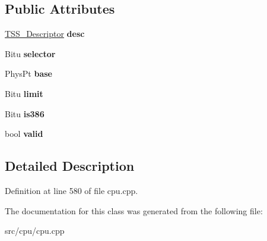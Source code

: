 \subsection*{Public Attributes}
\begin{DoxyCompactItemize}
\item 
\hypertarget{classTaskStateSegment_a46267346746acbf867d029fd39f902e3}{\hyperlink{classTSS__Descriptor}{T\-S\-S\-\_\-\-Descriptor} {\bfseries desc}}\label{classTaskStateSegment_a46267346746acbf867d029fd39f902e3}

\item 
\hypertarget{classTaskStateSegment_a0875f365d4c5477c70ed057924991bd5}{Bitu {\bfseries selector}}\label{classTaskStateSegment_a0875f365d4c5477c70ed057924991bd5}

\item 
\hypertarget{classTaskStateSegment_a95148a6c625f7821ad346627e7fe7829}{Phys\-Pt {\bfseries base}}\label{classTaskStateSegment_a95148a6c625f7821ad346627e7fe7829}

\item 
\hypertarget{classTaskStateSegment_a4dce1fe9bc4bd459bd908140219759f6}{Bitu {\bfseries limit}}\label{classTaskStateSegment_a4dce1fe9bc4bd459bd908140219759f6}

\item 
\hypertarget{classTaskStateSegment_ab002072334f2f1b417358b87e03a01e7}{Bitu {\bfseries is386}}\label{classTaskStateSegment_ab002072334f2f1b417358b87e03a01e7}

\item 
\hypertarget{classTaskStateSegment_a952e7e2635dd1b3074779a0498d74775}{bool {\bfseries valid}}\label{classTaskStateSegment_a952e7e2635dd1b3074779a0498d74775}

\end{DoxyCompactItemize}


\subsection{Detailed Description}


Definition at line 580 of file cpu.\-cpp.



The documentation for this class was generated from the following file\-:\begin{DoxyCompactItemize}
\item 
src/cpu/cpu.\-cpp\end{DoxyCompactItemize}
